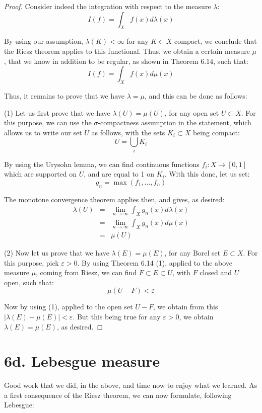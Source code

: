\documentclass[12pt]{amsbook}
\begin{document}
\begin{proof}
Consider indeed the integration with respect to the measure $\lambda$:
$$I(f)=\int_Xf(x)d\lambda(x)$$

By using our assumption, $\lambda(K)<\infty$ for any $K\subset X$ compact, we conclude that the Riesz theorem applies to this functional. Thus, we obtain a certain measure $\mu$, that we know in addition to be regular, as shown in Theorem 6.14, such that:
$$I(f)=\int_Xf(x)d\mu(x)$$

Thus, it remains to prove that we have $\lambda=\mu$, and this can be done as follows:

\medskip

(1) Let us first prove that we have $\lambda(U)=\mu(U)$, for any open set $U\subset X$. For this purpose, we can use the $\sigma$-compactness assumption in the statement, which allows us to write our set $U$ as follows, with the sets $K_i\subset X$ being compact:
$$U=\bigcup_iK_i$$

By using the Urysohn lemma, we can find continuous functions $f_i:X\to[0,1]$ which are supported on $U$, and are equal to 1 on $K_i$. With this done, let us set:
$$g_n=\max(f_1,\ldots,f_n)$$

The monotone convergence theorem applies then, and gives, as desired:
\begin{eqnarray*}
\lambda(U)
&=&\lim_{n\to\infty}\int_Xg_n(x)d\lambda(x)\\
&=&\lim_{n\to\infty}\int_Xg_n(x)d\mu(x)\\
&=&\mu(U)
\end{eqnarray*}

(2) Now let us prove that we have $\lambda(E)=\mu(E)$, for any Borel set $E\subset X$. For this purpose, pick $\varepsilon>0$. By using Theorem 6.14 (1), applied to the above measure $\mu$, coming from Riesz, we can find $F\subset E\subset U$, with $F$ closed and $U$ open, such that:
$$\mu(U-F)<\varepsilon$$

Now by using (1), applied to the open set $U-F$, we obtain from this $|\lambda(E)-\mu(E)|<\varepsilon$. But this being true for any $\varepsilon>0$, we obtain $\lambda(E)=\mu(E)$, as desired.
\end{proof}

\section*{6d. Lebesgue measure}

Good work that we did, in the above, and time now to enjoy what we learned. As a first consequence of the Riesz theorem, we can now formulate, following Lebesgue:
\end{document}
